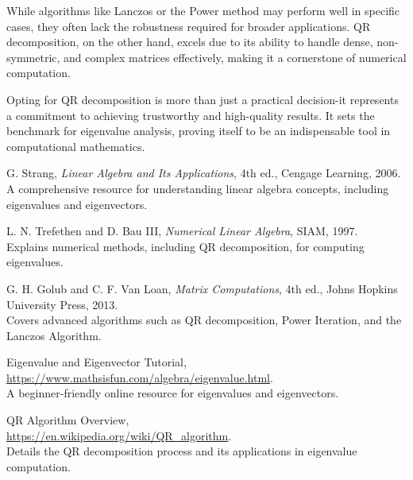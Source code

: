 \documentclass[journal]{IEEEtran}
\begin{document}
While algorithms like Lanczos or the Power method may perform well in specific cases, they often lack the robustness required for broader applications. QR decomposition, on the other hand, excels due to its ability to handle dense, non-symmetric, and complex matrices effectively, making it a cornerstone of numerical computation.

Opting for QR decomposition is more than just a practical decision-it represents a commitment to achieving trustworthy and high-quality results. It sets the benchmark for eigenvalue analysis, proving itself to be an indispensable tool in computational mathematics.\\

\begin{thebibliography}{9}

G. Strang, 
\textit{Linear Algebra and Its Applications}, 
4th ed., Cengage Learning, 2006. \\
A comprehensive resource for understanding linear algebra concepts, including eigenvalues and eigenvectors.

L. N. Trefethen and D. Bau III, 
\textit{Numerical Linear Algebra}, 
SIAM, 1997. \\
Explains numerical methods, including QR decomposition, for computing eigenvalues.

G. H. Golub and C. F. Van Loan, 
\textit{Matrix Computations}, 
4th ed., Johns Hopkins University Press, 2013. \\
Covers advanced algorithms such as QR decomposition, Power Iteration, and the Lanczos Algorithm.

Eigenvalue and Eigenvector Tutorial, \\
\url{https://www.mathsisfun.com/algebra/eigenvalue.html}. \\
A beginner-friendly online resource for eigenvalues and eigenvectors.

QR Algorithm Overview, \\
\url{https://en.wikipedia.org/wiki/QR_algorithm}. \\
Details the QR decomposition process and its applications in eigenvalue computation.

\end{thebibliography}
\end{document}
